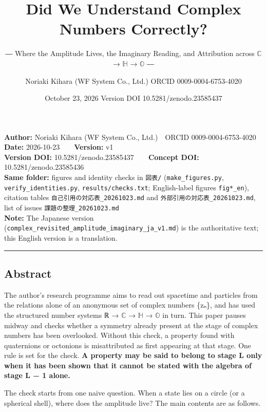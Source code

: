 \documentclass[
  a4paper,
]{article}
\title{Did We Understand Complex Numbers Correctly?}
\subtitle{― Where the Amplitude Lives, the Imaginary Reading, and
Attribution across \(\mathbb{C}\) → \(\mathbb{H}\) → \(\mathbb{O}\) ―}
\author{Noriaki Kihara (WF System Co., Ltd.) ORCID 0009-0004-6753-4020}
\date{October 23, 2026 Version DOI 10.5281/zenodo.23585437}
\begin{document}
\maketitle

\textbf{Author:} Noriaki Kihara (WF System Co., Ltd.)　ORCID
0009-0004-6753-4020\\
\textbf{Date:} 2026-10-23　　\textbf{Version:} v1\\
\textbf{Version DOI:} 10.5281/zenodo.23585437　　\textbf{Concept DOI:}
10.5281/zenodo.23585436\\
\textbf{Same folder:} figures and identity checks in \texttt{図表/\allowbreak{}}
(\texttt{make\_\allowbreak{}figures.py}, \texttt{verify\_\allowbreak{}identities.py},
\texttt{results/\allowbreak{}checks.txt}; English-label figures \texttt{fig*\_\allowbreak{}en}),
citation tables \texttt{自己引用の対応表\_\allowbreak{}20261023.md} and
\texttt{外部引用の対応表\_\allowbreak{}20261023.md}, list of issues
\texttt{課題の整理\_\allowbreak{}20261023.md}\\
\textbf{Note:} The Japanese version
(\texttt{complex\_\allowbreak{}revisited\_\allowbreak{}amplitude\_\allowbreak{}imaginary\_\allowbreak{}ja\_\allowbreak{}v1.md}) is the
authoritative text; this English version is a translation.

\begin{center}\rule{0.5\linewidth}{0.5pt}\end{center}

\subsection{Abstract}\label{abstract}

The author's research programme aims to read out spacetime and particles
from the relations alone of an anonymous set of complex numbers \{zₙ\},
and has used the structured number systems ℝ → \(\mathbb{C}\) →
\(\mathbb{H}\) → \(\mathbb{O}\) in turn. This paper pauses midway and
checks whether a symmetry already present at the stage of complex
numbers has been overlooked. Without this check, a property found with
quaternions or octonions is misattributed as first appearing at that
stage. One rule is set for the check. \textbf{A property may be said to
belong to stage L only when it has been shown that it cannot be stated
with the algebra of stage L − 1 alone.}

The check starts from one naive question. When a state lies on a circle
(or a spherical shell), where does the amplitude live? The main contents
are as follows.
\end{document}
